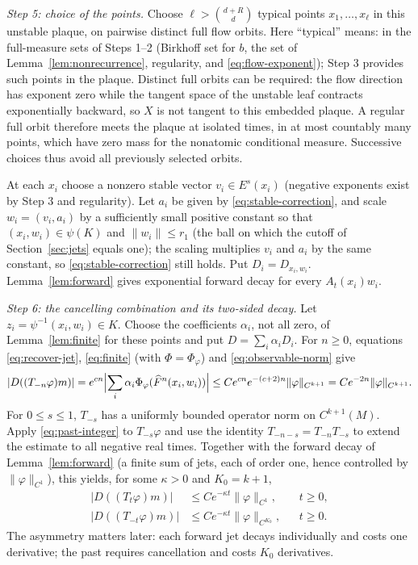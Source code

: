 \documentclass[11pt]{article}
\theoremstyle{remark}
\begin{document}
\emph{Step 5: choice of the points.}
Choose
\(\ell>\binom{d+R}{d}\) typical points \(x_1,\ldots,x_\ell\)
in this unstable plaque, on pairwise distinct full flow orbits.
Here ``typical'' means: in the full-measure sets of Steps 1--2
(Birkhoff set for \(b\), the set of Lemma~\ref{lem:nonrecurrence},
regularity, and \eqref{eq:flow-exponent}); Step 3 provides such points
in the plaque.
Distinct full orbits can be required: the flow direction has
exponent zero while the tangent space of the unstable leaf contracts
exponentially backward, so \(X\) is not tangent to this embedded
plaque.  A regular full orbit therefore meets the plaque at isolated
times, in at most countably many points, which have zero mass for
the nonatomic conditional measure.  Successive choices thus avoid
all previously selected orbits.

At each \(x_i\) choose a nonzero stable vector \(v_i\in E^s(x_i)\)
(negative exponents exist by Step 3 and regularity).
Let \(a_i\) be given by \eqref{eq:stable-correction}, and scale
\(w_i=(v_i,a_i)\) by a sufficiently small positive constant so that
\((x_i,w_i)\in\psi(K)\) and \(\|w_i\|\le r_1\) (the ball on which the
cutoff of Section~\ref{sec:jets} equals one); the scaling multiplies
\(v_i\) and \(a_i\) by the same constant, so
\eqref{eq:stable-correction} still holds.
Put \(D_i=D_{x_i,w_i}\).
Lemma~\ref{lem:forward} gives exponential forward decay for every
\(A_t(x_i)w_i\).

\emph{Step 6: the cancelling combination and its two-sided decay.}
Let \(z_i=\psi^{-1}(x_i,w_i)\in K\).
Choose the coefficients \(\alpha_i\), not all zero, of
Lemma~\ref{lem:finite} for these points and put \(D=\sum_i\alpha_iD_i\).
For \(n\ge0\), equations \eqref{eq:recover-jet}, \eqref{eq:finite}
(with \(\Phi=\Phi_\varphi\)) and \eqref{eq:observable-norm} give
\begin{equation}\label{eq:past-integer}
 |D((T_{-n}\varphi)m)|
  =e^{cn}\Bigl|\sum_i\alpha_i\Phi_\varphi(\widehat F^n(x_i,w_i))\Bigr|
  \le C e^{cn}e^{-(c+2)n}\|\varphi\|_{C^{k+1}}
  =Ce^{-2n}\|\varphi\|_{C^{k+1}}.
\end{equation}
For \(0\le s\le1\), \(T_{-s}\) has a uniformly bounded operator norm
on \(C^{k+1}(M)\).
Apply \eqref{eq:past-integer} to \(T_{-s}\varphi\) and use the
identity \(T_{-n-s}=T_{-n}T_{-s}\) to extend the estimate to all
negative real times.
Together with the forward decay of Lemma~\ref{lem:forward} (a finite
sum of jets, each of order one, hence controlled by
\(\|\varphi\|_{C^1}\)), this yields, for some \(\kappa>0\)
and \(K_0=k+1\),
\begin{equation}\label{eq:two-tails}
 \begin{aligned}
 |D((T_t\varphi)m)|&\le Ce^{-\kappa t}\|\varphi\|_{C^1},
                                      &&t\ge0,\\
 |D((T_{-t}\varphi)m)|&\le Ce^{-\kappa t}\|\varphi\|_{C^{K_0}},
                                      &&t\ge0.
 \end{aligned}
\end{equation}
The asymmetry matters later: each forward jet decays individually
and costs one derivative; the past requires cancellation and costs
\(K_0\) derivatives.
\end{document}
